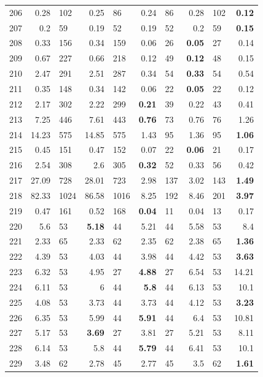 \begin{longtable}{lr@{\hskip 4pt}l@{\hskip 12pt}r@{\hskip 4pt}l@{\hskip 12pt}r@{\hskip 4pt}l@{\hskip 12pt}r@{\hskip 4pt}l@{\hskip 12pt}r}
206 & 0.28 & 102 & 0.25 & 86 & 0.24 & 86 & 0.28 & 102 & \textbf{0.12} \\
207 & 0.2 & 59 & 0.19 & 52 & 0.19 & 52 & 0.2 & 59 & \textbf{0.15} \\
208 & 0.33 & 156 & 0.34 & 159 & 0.06 & 26 & \textbf{0.05} & 27 & 0.14 \\
209 & 0.67 & 227 & 0.66 & 218 & 0.12 & 49 & \textbf{0.12} & 48 & 0.15 \\
210 & 2.47 & 291 & 2.51 & 287 & 0.34 & 54 & \textbf{0.33} & 54 & 0.54 \\
211 & 0.35 & 148 & 0.34 & 142 & 0.06 & 22 & \textbf{0.05} & 22 & 0.12 \\
212 & 2.17 & 302 & 2.22 & 299 & \textbf{0.21} & 39 & 0.22 & 43 & 0.41 \\
213 & 7.25 & 446 & 7.61 & 443 & \textbf{0.76} & 73 & 0.76 & 76 & 1.26 \\
214 & 14.23 & 575 & 14.85 & 575 & 1.43 & 95 & 1.36 & 95 & \textbf{1.06} \\
215 & 0.45 & 151 & 0.47 & 152 & 0.07 & 22 & \textbf{0.06} & 21 & 0.17 \\
216 & 2.54 & 308 & 2.6 & 305 & \textbf{0.32} & 52 & 0.33 & 56 & 0.42 \\
217 & 27.09 & 728 & 28.01 & 723 & 2.98 & 137 & 3.02 & 143 & \textbf{1.49} \\
218 & 82.33 & 1024 & 86.58 & 1016 & 8.25 & 192 & 8.46 & 201 & \textbf{3.97} \\
219 & 0.47 & 161 & 0.52 & 168 & \textbf{0.04} & 11 & 0.04 & 13 & 0.17 \\
220 & 5.6 & 53 & \textbf{5.18} & 44 & 5.21 & 44 & 5.58 & 53 & 8.4 \\
221 & 2.33 & 65 & 2.33 & 62 & 2.35 & 62 & 2.38 & 65 & \textbf{1.36} \\
222 & 4.39 & 53 & 4.03 & 44 & 3.98 & 44 & 4.42 & 53 & \textbf{3.63} \\
223 & 6.32 & 53 & 4.95 & 27 & \textbf{4.88} & 27 & 6.54 & 53 & 14.21 \\
224 & 6.11 & 53 & 6 & 44 & \textbf{5.8} & 44 & 6.13 & 53 & 10.1 \\
225 & 4.08 & 53 & 3.73 & 44 & 3.73 & 44 & 4.12 & 53 & \textbf{3.23} \\
226 & 6.35 & 53 & 5.99 & 44 & \textbf{5.91} & 44 & 6.4 & 53 & 10.81 \\
227 & 5.17 & 53 & \textbf{3.69} & 27 & 3.81 & 27 & 5.21 & 53 & 8.11 \\
228 & 6.14 & 53 & 5.8 & 44 & \textbf{5.79} & 44 & 6.41 & 53 & 10.1 \\
229 & 3.48 & 62 & 2.78 & 45 & 2.77 & 45 & 3.5 & 62 & \textbf{1.61} \\

\end{longtable}
